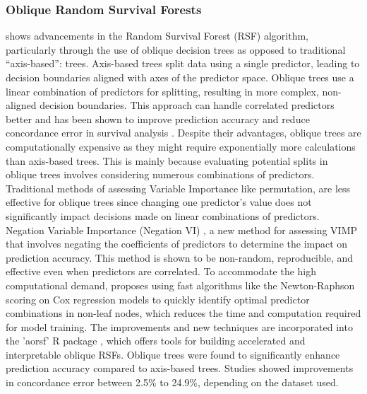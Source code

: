 \subsubsection{Oblique Random Survival Forests}
\noindent \parencite{jaeger_accelerated_2022} shows advancements in the Random Survival Forest (RSF) algorithm, particularly through the use of oblique decision trees as opposed to traditional “axis-based”: trees. \parencite{jaeger_accelerated_2022} Axis-based trees split data using a single predictor, leading to decision boundaries aligned with axes of the predictor space. Oblique trees use a linear combination of predictors for splitting, resulting in more complex, non-aligned decision boundaries. This approach can handle correlated predictors better and has been shown to improve prediction accuracy and reduce concordance error in survival analysis \parencite{jaeger_accelerated_2022}. Despite their advantages, oblique trees are computationally expensive as they might require exponentially more calculations than axis-based trees. This is mainly because evaluating potential splits in oblique trees involves considering numerous combinations of predictors. Traditional methods of assessing Variable Importance \parencite{pham_springer_2023} like permutation, are less effective for oblique trees since changing one predictor's value does not significantly impact decisions made on linear combinations of predictors. Negation Variable Importance (Negation VI) \parencite{jaeger_accelerated_2022}, a new method for assessing VIMP that involves negating the coefficients of predictors to determine the impact on prediction accuracy. This method is shown to be non-random, reproducible, and effective even when predictors are correlated. To accommodate the high computational demand, \parencite{jaeger_accelerated_2022} proposes using fast algorithms like the Newton-Raphson scoring on Cox regression models to quickly identify optimal predictor combinations in non-leaf nodes, which reduces the time and computation required for model training. The improvements and new techniques are incorporated into the 'aorsf' R package \parencite{jaeger_accelerated_2022}, which offers tools for building accelerated and interpretable oblique RSFs. Oblique trees were found to significantly enhance prediction accuracy compared to axis-based trees. Studies showed improvements in concordance error between 2.5\% to 24.9\%, depending on the dataset used.

